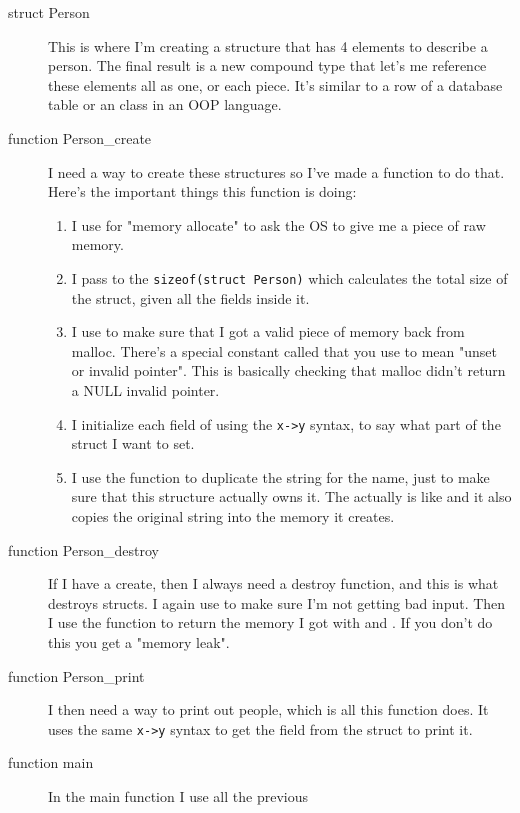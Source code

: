 \begin{description}
\item [struct Person] This is where I'm creating a structure that
    has 4 elements to describe a person.  The final result is a
    new compound type that let's me reference these elements all
    as one, or each piece.  It's similar to a row of a database
    table or an class in an OOP language.
\item[function Person\_create] I need a way to create these structures
    so I've made a function to do that.  Here's the important 
    things this function is doing:
    \begin{enumerate}
    \item I use  for "memory allocate" to ask the OS
        to give me a piece of raw memory.
    \item I pass to  the \verb|sizeof(struct Person)| 
        which calculates the total size of the struct, given all the 
        fields inside it.
    \item I use  to make sure that I got a valid 
        piece of memory back from malloc.  There's a special constant called
     that you use to mean "unset or invalid pointer".  This
     is basically checking that malloc didn't return a
        NULL invalid pointer.
    \item I initialize each field of  using the
        \verb|x->y| syntax, to say what part of the struct I want to set.
    \item I use the  function to duplicate the string 
        for the name, just to make sure that this structure actually owns
        it.  The  actually is like  and it also
        copies the original string into the memory it creates.
    \end{enumerate}
\item[function Person\_destroy] If I have a create, then I always need
    a destroy function, and this is what destroys  structs.
    I again use  to make sure I'm not getting bad input.
    Then I use the function  to return the memory I got with
     and .  If you don't do this you get
    a "memory leak".
\item[function Person\_print] I then need a way to print out people,
    which is all this function does.  It uses the same \verb|x->y|
    syntax to get the field from the struct to print it.
\item[function main] In the main function I use all the previous

\end{description}

